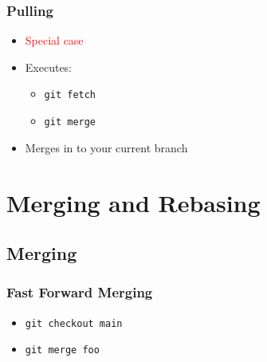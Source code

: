 \begin{frame}
  \frametitle{Pulling}
  \begin{itemize}
  \item \textcolor{red}{Special case}
  \item Executes:
    \begin{itemize}
    \item \texttt{git fetch}
    \item \texttt{git merge}
    \end{itemize}
  \item Merges in to your current branch
  \end{itemize}
\end{frame}

\section{Merging and Rebasing}

\subsection{Merging}

\begin{frame}
  \frametitle{Fast Forward Merging}
  \begin{itemize}
    \item \texttt{git checkout main}
    \item \texttt{git merge foo}
  \end{itemize}
\end{frame}

